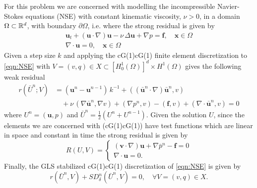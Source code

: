     For this problem we are concerned with modelling the incompressible
    Navier-Stokes equations (NSE) with constant kinematic viscosity, $\nu>0$, in
    a domain $\Omega\subset \mathbb{R}^d$, with boundary $\partial \Omega$, i.e.  where
    the strong residual is given by
    \begin{equation}
        \begin{split}
            \mathbf{u}_t + \left( \mathbf{u} \cdot \nabla \right) \mathbf{u}
                - \nu\, \Delta \mathbf{u} + \nabla p = \mathbf{f},
                    \quad \mathbf{x} \in \Omega \\
            \nabla \cdot \mathbf{u} = 0, \quad \mathbf{x} \in \Omega
        \end{split}
    \label{eqn:NSE}
    \end{equation}
    Given a step size $k$ and applying the cG(1)cG(1) finite element discretization
    to \eqref{eqn:NSE} with $V = (v, q) \in X \subset [H^1_0(\Omega)]^d \times
    H^1(\Omega)$ gives the following weak residual
    \begin{equation}
    \begin{split}
        r(\bar{U}^n; V) &= \left(\mathbf{u}^n - \mathbf{u}^{n-1}\right)\,k^{-1}
            + (\left( \bar{\mathbf{u}}^n \cdot \nabla \right) \bar{\mathbf{u}}^n, v) \\
            &\quad+ \nu\, (\nabla \bar{\mathbf{u}}^n, \nabla v)
            + (\nabla p^n, v) - (\mathbf{f}, v)
            + (\nabla \cdot \bar{\mathbf{u}}^n, v) = 0
    \end{split}
    \label{eqn:WeakNSE}
    \end{equation}
    where $U^n = (\mathbf{u}, p)$ and $\bar{U}^n = \frac{1}{2}\left(U^n +
    U^{n-1}\right)$. Given the solution $U$, since the elements we are concerned
    with (cG(1)cG(1)) have test functions which are linear in space and constant
    in time the strong residual is given by
    \begin{equation}
        R(U,V) = \begin{cases}
                \left(\mathbf{v} \cdot \nabla \right) \mathbf{u}
                + \nabla \bar{p}^n - \mathbf{f} = 0 \\
            \nabla \cdot \mathbf{u} = 0.
        \end{cases}
    \label{eqn:StrongNSE}
    \end{equation}
    Finally, the GLS stabilized cG(1)cG(1) discretization of \eqref{eqn:NSE} is
    given by
    \begin{equation}
    r(\bar{U}^n,V) + SD_{\delta}^n(\bar{U}^n,V) = 0, \quad \forall V = (v,q) \in X.
    \label{eqn:G2}
    \end{equation}
